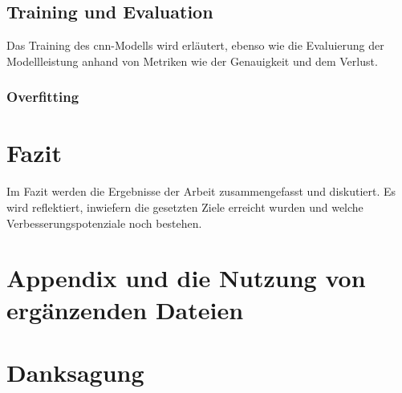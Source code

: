 \documentclass[journal,twoside,web]{ieeecolor}
\begin{document}
\subsection{Training und Evaluation}
Das Training des \ac{cnn}-Modells wird erläutert, ebenso wie die Evaluierung der Modellleistung anhand von Metriken wie der Genauigkeit und dem Verlust.

\subsubsection{Overfitting}
\label{sec:overfitting}

\section{Fazit}
Im Fazit werden die Ergebnisse der Arbeit zusammengefasst und diskutiert. Es wird reflektiert, inwiefern die gesetzten Ziele erreicht wurden und welche Verbesserungspotenziale noch bestehen.








\appendices

\section*{Appendix und die Nutzung von ergänzenden Dateien}

\section*{Danksagung}
\end{document}
